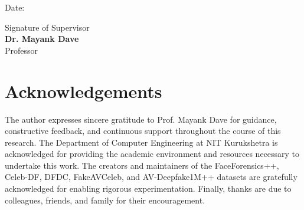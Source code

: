 \documentclass[12pt,oneside,a4paper]{report}
\numberwithin{figure}{chapter}
\numberwithin{table}{chapter}
\begin{document}
\vspace{1.5cm}

\noindent Date: \underline{\hspace{3cm}}

\vspace{1cm}

\begin{flushright}
\parbox{6cm}{
    Signature of Supervisor\\[0.5cm]
    \textbf{Dr. Mayank Dave}\\
    Professor
}
\end{flushright}

\clearpage

% 





\chapter*{Acknowledgements}
The author expresses sincere gratitude to Prof. Mayank Dave for guidance, constructive feedback, and continuous support throughout the course of this research. The Department of Computer Engineering at NIT Kurukshetra is acknowledged for providing the academic environment and resources necessary to undertake this work. The creators and maintainers of the FaceForensics++, Celeb-DF, DFDC, FakeAVCeleb, and AV-Deepfake1M++ datasets are gratefully acknowledged for enabling rigorous experimentation. Finally, thanks are due to colleagues, friends, and family for their encouragement.

\clearpage

\end{document}
